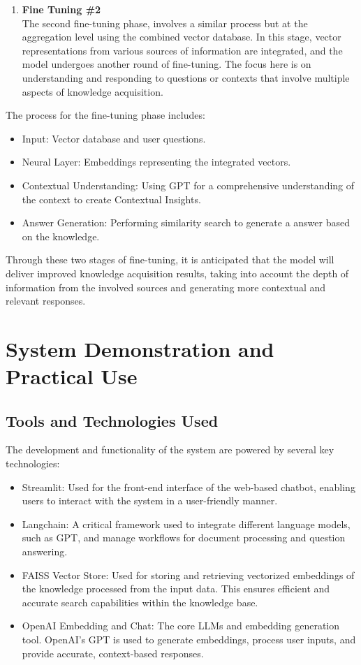 \documentclass[runningheads]{llncs}
\begin{document}
\begin{enumerate}
    \item \textbf{Fine Tuning \#2} \\
        The second fine-tuning phase, involves a similar process but at the aggregation level using the combined vector database. In this stage, vector representations from various sources of information are integrated, and the model undergoes another round of fine-tuning. The focus here is on understanding and responding to questions or contexts that involve multiple aspects of knowledge acquisition.
\end{enumerate}

            
The process for the fine-tuning phase includes:
\begin{itemize}
    \item Input: Vector database and user questions.
    \item Neural Layer: Embeddings representing the integrated vectors.
    \item Contextual Understanding: Using GPT for a comprehensive understanding of the context to create Contextual Insights.
    \item Answer Generation: Performing similarity search to generate a answer based on the  knowledge.
\end{itemize}

Through these two stages of fine-tuning, it is anticipated that the model will deliver improved knowledge acquisition results, taking into account the depth of information from the involved sources and generating more contextual and relevant responses.


\section{System Demonstration and Practical Use}
\subsection{Tools and Technologies Used}
The development and functionality of the system are powered by several key technologies:
\begin{itemize}
    \item Streamlit: Used for the front-end interface of the web-based chatbot, enabling users to interact with the system in a user-friendly manner.
    \item Langchain: A critical framework used to integrate different language models, such as GPT, and manage workflows for document processing and question answering.
    \item FAISS Vector Store: Used for storing and retrieving vectorized embeddings of the knowledge processed from the input data. This ensures efficient and accurate search capabilities within the knowledge base.
    \item OpenAI Embedding and Chat: The core LLMs and embedding generation tool. OpenAI's GPT is used to generate embeddings, process user inputs, and provide accurate, context-based responses.
\end{itemize}
\end{document}

